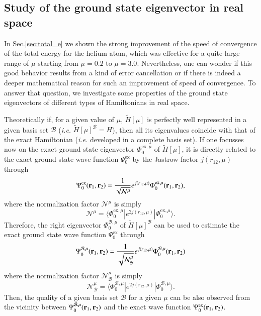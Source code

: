 \documentclass[aip,jcp,reprint,noshowkeys,superscriptaddress]{revtex4-1}
\newcommand{\matelem}[3]{\langle #1 | #2 | #3 \rangle}
\newcommand{\br}[0]{{\bf {r}}}
\newcommand{\psiex}[0]{\Psi^{\text{ex}}_0}
\newcommand{\phimu}[0]{\Phi^{\text{ex},\mu}_0}
\newcommand{\phimub}[0]{\Phi^{\mathcal{B},\mu}_0}
\newcommand{\psimub}[0]{\Psi^{\mathcal{B},\mu}_0}
\newcommand{\basis}[0]{\mathcal{B}}
\begin{document}
\subsection{Study of the ground state eigenvector in real space}
In Sec.\ref{sec:total_e} we shown the strong improvement of the speed of convergence of the total energy for the helium atom, which was effective for a quite large range of $\mu$ starting from $\mu=0.2$ to $\mu=3.0$. 
Nevertheless, one can wonder if this good behavior results from a kind of error cancellation or if there is indeed a deeper mathematical reason for such an improvement of speed of convergence. 
To answer that question, we investigate some properties of the ground state eigenvectors of different types of Hamiltonians in real space. 

Theoretically if, for a given value of $\mu$, $\tilde{H}[\mu]$ is perfectly well represented in a given basis set $\mathcal{B}$ (\textit{i.e.} $\tilde{H}[\mu]^{\basis} = H$), then all its eigenvalues coincide with that of the exact Hamiltonian (\textit{i.e.} developed in a complete basis set). If one focusses now on the exact ground state eigenvector $\phimu$ of $\tilde{H}[\mu]$, it is directly related to the exact ground state wave function $\psiex$ by the Jastrow factor $j(r_{12},\mu)$ through 
\begin{equation}
 \psiex(\br{}_1,\br{}_2) =  \frac{1}{\sqrt{\mathcal{N}^{\mu}}} e^{j(r_{12},\mu)} \phimu(\br{}_1,\br{}_2), 
\end{equation}
where the normalization factor $\mathcal{N}^{\mu}$ is simply 
\begin{equation}
  \mathcal{N}^{\mu} = \matelem{\phimu}{e^{2 j(r_{12},\mu)}}{\phimu}.
\end{equation}
Therefore, the right eigenvector $\phimub$ of $\tilde{H}[\mu]^{\basis}$ can be used to estimate the exact ground state wave function $\psiex$ through 
\begin{equation}
 \psimub(\br{}_1,\br{}_2) = \frac{1}{\sqrt{\mathcal{N}_{\basis}^{\mu}}}e^{j(r_{12},\mu)}\phimub(\br{}_1,\br{}_2)
\end{equation}
where the normalization factor $\mathcal{N}_{\basis}^{\mu}$ is simply
\begin{equation}
  \mathcal{N}_{\basis}^{\mu} = \matelem{\phimub}{e^{2 j(r_{12},\mu)}}{\phimub}.
\end{equation}
Then, the quality of a given basis set $\basis$ for a given $\mu$ can be also observed from the vicinity between $\psimub(\br{}_1,\br{}_2)$ and the exact wave function $\psiex(\br{}_1,\br{}_2)$. 
\end{document}
